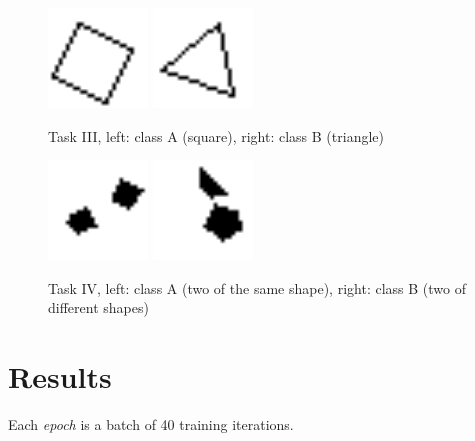 \documentclass{article}
\renewcommand{\it}{\textit}
\begin{document}
\clearpage

\begin{figure}[h]
  \centering
  \includegraphics[width=100px]{simpleshape-example-A.png}
  \hspace{100px}
  \includegraphics[width=100px]{simpleshape-example-B.png}
  \label{fig:simpleshape-example}
  \caption{Task III, left: class A (square), right: class B (triangle)}
\end{figure}

\vspace{4cm}

\begin{figure}[h]
  \centering
  \includegraphics[width=100px]{matching-example-A.png}
  \hspace{100px}
  \includegraphics[width=100px]{matching-example-B.png}
  \label{fig:matching-example}
  \caption{Task IV, left: class A (two of the same shape), right: class B (two of different shapes)}
\end{figure}

\newpage
\restoregeometry
\pagestyle{plain}
\section{Results}

Each \it{epoch} is a batch of 40 training iterations.
\end{document}
